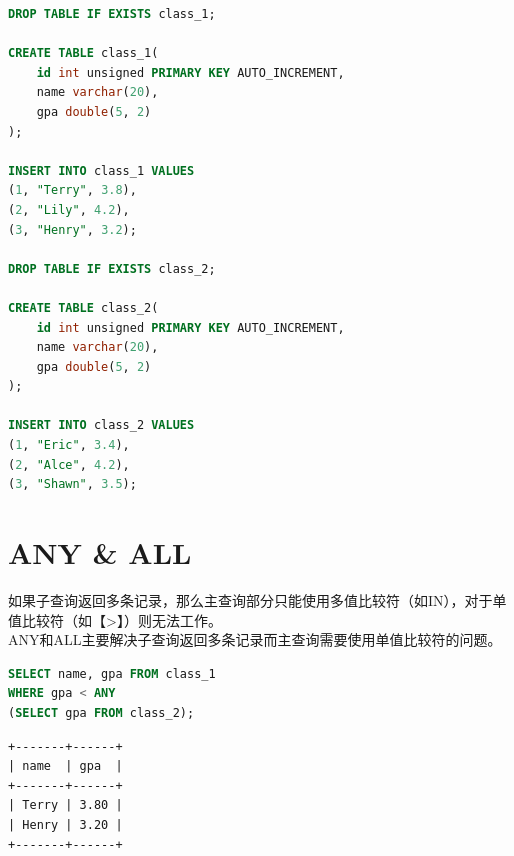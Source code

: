 \documentclass[12pt, openany, oneside]{book}
\begin{document}

\begin{lstlisting}[language=SQL]
DROP TABLE IF EXISTS class_1;

CREATE TABLE class_1(
    id int unsigned PRIMARY KEY AUTO_INCREMENT,
    name varchar(20),
    gpa double(5, 2)
);

INSERT INTO class_1 VALUES
(1, "Terry", 3.8),
(2, "Lily", 4.2),
(3, "Henry", 3.2);

DROP TABLE IF EXISTS class_2;

CREATE TABLE class_2(
    id int unsigned PRIMARY KEY AUTO_INCREMENT,
    name varchar(20),
    gpa double(5, 2)
);

INSERT INTO class_2 VALUES
(1, "Eric", 3.4),
(2, "Alce", 4.2),
(3, "Shawn", 3.5);
\end{lstlisting}

\section{ANY \& ALL}

如果子查询返回多条记录，那么主查询部分只能使用多值比较符（如IN），对于单值比较符（如【>】）则无法工作。 \\

ANY和ALL主要解决子查询返回多条记录而主查询需要使用单值比较符的问题。

\begin{table}[H]
    \centering
    \caption{ANY \& ALL}
\end{table}


\begin{lstlisting}[language=SQL]
SELECT name, gpa FROM class_1
WHERE gpa < ANY
(SELECT gpa FROM class_2);
\end{lstlisting}

\begin{tcolorbox}
    \begin{verbatim}
+-------+------+
| name  | gpa  |
+-------+------+
| Terry | 3.80 |
| Henry | 3.20 |
+-------+------+
	\end{verbatim}
\end{tcolorbox}
\end{document}
